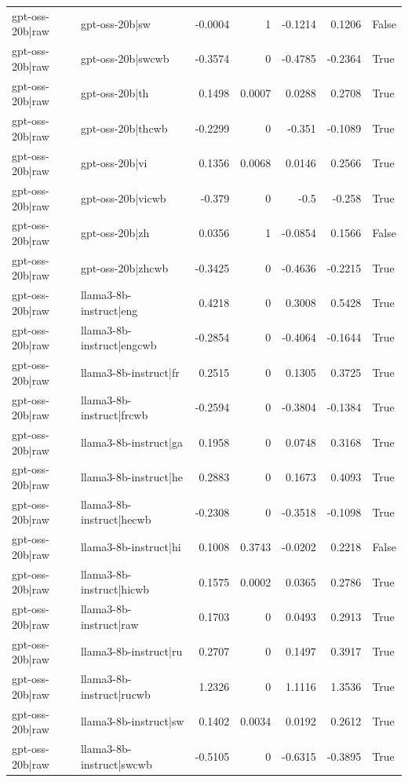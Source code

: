 \begin{table}
\begin{tabular}{l l r r r r l}
gpt-oss-20b|raw & gpt-oss-20b|sw & -0.0004 & 1 & -0.1214 & 0.1206 & False \\
gpt-oss-20b|raw & gpt-oss-20b|swcwb & -0.3574 & 0 & -0.4785 & -0.2364 & True \\
gpt-oss-20b|raw & gpt-oss-20b|th & 0.1498 & 0.0007 & 0.0288 & 0.2708 & True \\
gpt-oss-20b|raw & gpt-oss-20b|thcwb & -0.2299 & 0 & -0.351 & -0.1089 & True \\
gpt-oss-20b|raw & gpt-oss-20b|vi & 0.1356 & 0.0068 & 0.0146 & 0.2566 & True \\
gpt-oss-20b|raw & gpt-oss-20b|vicwb & -0.379 & 0 & -0.5 & -0.258 & True \\
gpt-oss-20b|raw & gpt-oss-20b|zh & 0.0356 & 1 & -0.0854 & 0.1566 & False \\
gpt-oss-20b|raw & gpt-oss-20b|zhcwb & -0.3425 & 0 & -0.4636 & -0.2215 & True \\
gpt-oss-20b|raw & llama3-8b-instruct|eng & 0.4218 & 0 & 0.3008 & 0.5428 & True \\
gpt-oss-20b|raw & llama3-8b-instruct|engcwb & -0.2854 & 0 & -0.4064 & -0.1644 & True \\
gpt-oss-20b|raw & llama3-8b-instruct|fr & 0.2515 & 0 & 0.1305 & 0.3725 & True \\
gpt-oss-20b|raw & llama3-8b-instruct|frcwb & -0.2594 & 0 & -0.3804 & -0.1384 & True \\
gpt-oss-20b|raw & llama3-8b-instruct|ga & 0.1958 & 0 & 0.0748 & 0.3168 & True \\
gpt-oss-20b|raw & llama3-8b-instruct|he & 0.2883 & 0 & 0.1673 & 0.4093 & True \\
gpt-oss-20b|raw & llama3-8b-instruct|hecwb & -0.2308 & 0 & -0.3518 & -0.1098 & True \\
gpt-oss-20b|raw & llama3-8b-instruct|hi & 0.1008 & 0.3743 & -0.0202 & 0.2218 & False \\
gpt-oss-20b|raw & llama3-8b-instruct|hicwb & 0.1575 & 0.0002 & 0.0365 & 0.2786 & True \\
gpt-oss-20b|raw & llama3-8b-instruct|raw & 0.1703 & 0 & 0.0493 & 0.2913 & True \\
gpt-oss-20b|raw & llama3-8b-instruct|ru & 0.2707 & 0 & 0.1497 & 0.3917 & True \\
gpt-oss-20b|raw & llama3-8b-instruct|rucwb & 1.2326 & 0 & 1.1116 & 1.3536 & True \\
gpt-oss-20b|raw & llama3-8b-instruct|sw & 0.1402 & 0.0034 & 0.0192 & 0.2612 & True \\
gpt-oss-20b|raw & llama3-8b-instruct|swcwb & -0.5105 & 0 & -0.6315 & -0.3895 & True \\

\end{tabular}
\end{table}
